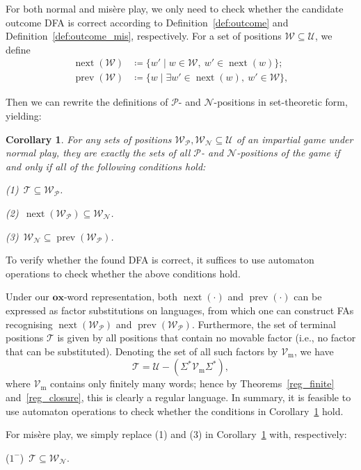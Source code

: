 \documentclass[11pt]{article}
\newtheorem{corollary}{Corollary}[section]
\theoremstyle{definition}
\theoremstyle{plain}
\newcommand{\varP}{\mathcal{P}}
\newcommand{\varN}{\mathcal{N}}
\newcommand{\x}{\mathbf{x}}
\newcommand{\e}{\mathbf{o}}
\newcommand{\varU}{\mathcal{U}}
\newcommand{\varV}{\mathcal{V}}
\newcommand{\varW}{\mathcal{W}}
\newcommand{\varT}{\mathcal{T}}
\newcommand{\nxt}{\operatorname{next}}
\newcommand{\prv}{\operatorname{prev}}
\begin{document}
For both normal and misère play, we only need to check whether the candidate outcome DFA is correct according to Definition~\ref{def:outcome} and Definition~\ref{def:outcome_mis}, respectively.
For a set of positions $\varW \subseteq \varU$, we define
\begin{align*}
    \nxt(\varW) &\coloneq \{w' \mid w\in\varW,\ w' \in \nxt(w)\}; \\
    \prv(\varW) &\coloneq \{w \mid \exists w'\in\nxt(w),\ w' \in \varW \},
\end{align*}

Then we can rewrite the definitions of $\varP$- and $\varN$-positions in set-theoretic form, yielding:

\begin{corollary}\label{outcome_cond}
    For any sets of positions $\varW_{\varP}, \varW_{\varN} \subseteq \varU$ of an impartial game under normal play,
    they are exactly the sets of all $\varP$- and $\varN$-positions of the game if and only if all of the following conditions hold:

    (1)~$\varT \subseteq \varW_{\varP}$.

    (2)~$\nxt(\varW_{\varP}) \subseteq \varW_{\varN}$.

    (3)~$\varW_{\varN} \subseteq \prv(\varW_{\varP})$.
\end{corollary}

To verify whether the found DFA is correct, it suffices to use automaton operations to check whether the above conditions hold.

Under our $\e\x$-word representation, both $\nxt(\cdot)$ and $\prv(\cdot)$ can be expressed as factor substitutions on languages,
from which one can construct FAs recognising $\nxt(\varW_{\varP})$ and $\prv(\varW_{\varP})$.
Furthermore, the set of terminal positions $\varT$ is given by all positions that contain no movable factor (i.e., no factor that can be substituted). Denoting the set of all such factors by $\varV_{\mathrm{m}}$, we have
\[
    \varT = \varU - (\varSigma^* \varV_{\mathrm{m}} \varSigma^*),
\]
where $\varV_{\mathrm{m}}$ contains only finitely many words; hence by Theorems~\ref{reg_finite} and~\ref{reg_closure}, this is clearly a regular language.
In summary, it is feasible to use automaton operations to check whether the conditions in Corollary~\ref{outcome_cond} hold.

For misère play, we simply replace (1) and (3) in Corollary~\ref{outcome_cond} with, respectively:

($1^-$)~$\varT \subseteq \varW_{\varN}$.
\end{document}
